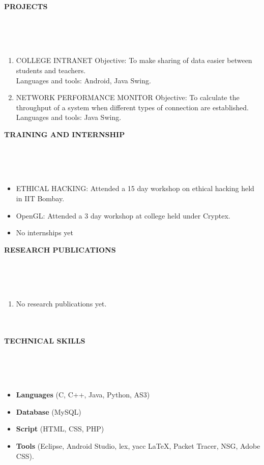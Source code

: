 \documentclass[a4paper,10pt]{article}
\newcommand{\lsep}{-0.5cm}
\newcommand{\resheading}[1]{{\small \colorbox{mygrey}{\begin{minipage}{0.975\textwidth}{\textbf{#1 \vphantom{p\^{E}}}}\end{minipage}}}}
\begin{document}
\resheading{\textbf{PROJECTS} }\\[\lsep]
\\ \\
\begin{enumerate}
		\item COLLEGE INTRANET
		\subitem Objective: To make sharing of data easier between students and teachers. \\
		\indent \indent Languages and tools: Android, Java Swing.
		
		\item NETWORK PERFORMANCE MONITOR
		\subitem Objective: To calculate the throughput of a system when different types of connection are established.
		\indent \indent Languages and tools: Java Swing.
\end{enumerate}

\resheading{\textbf{TRAINING AND INTERNSHIP} }\\[\lsep]
\\ \\
\begin{itemize}
					\item ETHICAL HACKING: Attended a 15 day workshop on ethical hacking held in IIT Bombay.
					\item OpenGL:
					Attended a 3 day workshop at college held under Cryptex.
					\item No internships yet
\end{itemize}

\resheading{\textbf{RESEARCH PUBLICATIONS} }\\[\lsep]
\\ \\
\begin{enumerate}
		\item No research publications yet. \\ \\ \\
\end{enumerate}

\resheading{\textbf{TECHNICAL SKILLS} }\\[\lsep]
\\ \\
\begin{itemize}
	\item \noindent \textbf{Languages} (C, C++, Java, Python, AS3)
	\item \noindent \textbf{Database} (MySQL)
	\item \noindent \textbf{Script} (HTML, CSS, PHP) 
	\item \noindent \textbf{Tools} (Eclipse, Android Studio, lex, yacc \LaTeX, Packet Tracer, NSG, Adobe CSS).
	
\end{itemize}
\end{document}
